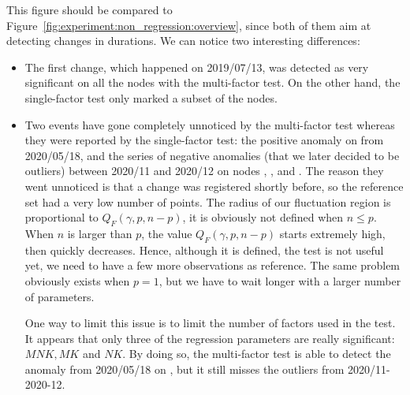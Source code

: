                 This figure should be compared to Figure~\ref{fig:experiment:non_regression:overview}, since both of
                them aim at detecting changes in \dgemm durations. We can notice two interesting differences:
                \begin{itemize}
                    \item The first change, which happened on 2019/07/13, was detected as very significant on all the
                        nodes with the multi-factor test. On the other hand, the single-factor test only marked a subset
                        of the nodes.
                    \item Two events have gone completely unnoticed by the multi-factor test whereas they were reported
                        by the single-factor test: the positive anomaly on  from 2020/05/18, and the series of
                        negative anomalies (that we later decided to be outliers) between 2020/11 and 2020/12 on nodes
                        , ,  and . The reason they went
                        unnoticed is that a change was registered shortly before, so the reference set had a very low
                        number of points. The radius of our fluctuation region is proportional to \(Q_F(\gamma, p,
                        n-p)\), it is obviously not defined when \(n \leq p\). When \(n\) is larger than \(p\), the value
                        \(Q_F(\gamma, p, n-p)\) starts extremely high, then quickly decreases. Hence, although it is
                        defined, the test is not useful yet, we need to have a few more observations as reference.
                        The same problem obviously exists when \(p=1\), but we have to wait longer with a larger number
                        of parameters.

                        One way to limit this issue is to limit the number of factors used in the test. It appears that
                        only three of the regression parameters are really significant: \(MNK, MK\) and \(NK\). By doing
                        so, the multi-factor test is able to detect the anomaly from 2020/05/18 on , but
                        it still misses the outliers from 2020/11-2020-12.
                \end{itemize}
